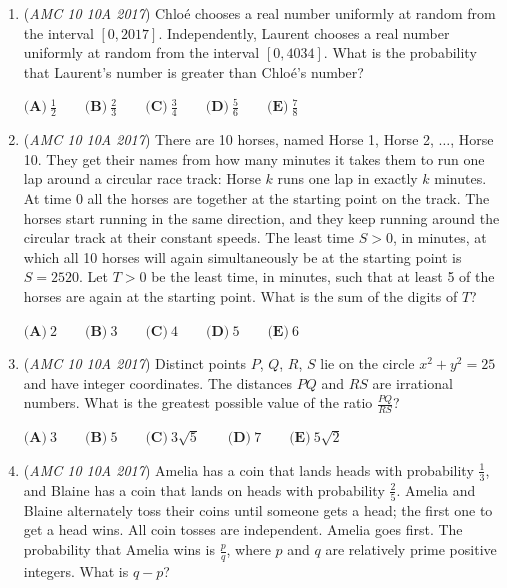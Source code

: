 \begin{enumerate}
 $\textbf{(A)}\ 9\%\qquad\textbf{(B)}\ 19\%\qquad\textbf{(C)}\ 22\%\qquad\textbf{(D)}\ 23\%\qquad\textbf{(E)}\ 25\%$


	\item (\textit{AMC 10 10A 2017}) Chloé chooses a real number uniformly at random from the interval $[0, 2017]$. Independently, Laurent chooses a real number uniformly at random from the interval $[0, 4034]$. What is the probability that Laurent's number is greater than Chloé's number? 


 $\textbf{(A)}\ \frac{1}{2}\qquad\textbf{(B)}\ \frac{2}{3}\qquad\textbf{(C)}\ \frac{3}{4}\qquad\textbf{(D)}\ \frac{5}{6}\qquad\textbf{(E)}\ \frac{7}{8}$


	\item (\textit{AMC 10 10A 2017}) There are 10 horses, named Horse 1, Horse 2, $\ldots$, Horse 10. They get their names from how many minutes it takes them to run one lap around a circular race track: Horse $k$ runs one lap in exactly $k$ minutes. At time 0 all the horses are together at the starting point on the track. The horses start running in the same direction, and they keep running around the circular track at their constant speeds. The least time $S>0$, in minutes, at which all 10 horses will again simultaneously be at the starting point is $S=2520$. Let $T>0$ be the least time, in minutes, such that at least 5 of the horses are again at the starting point. What is the sum of the digits of $T$?


 $\textbf{(A)}\ 2\qquad\textbf{(B)}\ 3\qquad\textbf{(C)}\ 4\qquad\textbf{(D)}\ 5\qquad\textbf{(E)}\ 6$


	\item (\textit{AMC 10 10A 2017}) Distinct points $P$, $Q$, $R$, $S$ lie on the circle $x^2+y^2=25$ and have integer coordinates. The distances $PQ$ and $RS$  are irrational numbers. What is the greatest possible value of the ratio $\frac{PQ}{RS}$?


 $\textbf{(A)}\ 3\qquad\textbf{(B)}\ 5\qquad\textbf{(C)}\ 3\sqrt{5}\qquad\textbf{(D)}\ 7\qquad\textbf{(E)}\ 5\sqrt{2}$


	\item (\textit{AMC 10 10A 2017}) Amelia has a coin that lands heads with probability $\frac{1}{3}$, and Blaine has a coin that lands on heads with probability $\frac{2}{5}$. Amelia and Blaine alternately toss their coins until someone gets a head; the first one to get a head wins. All coin tosses are independent. Amelia goes first. The probability that Amelia wins is $\frac{p}{q}$, where $p$ and $q$ are relatively prime positive integers. What is $q-p$?



\end{enumerate}
